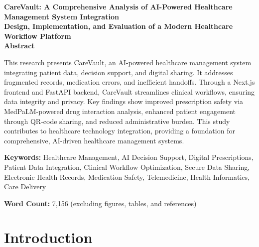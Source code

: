 \documentclass[12pt,a4paper]{article}
\begin{document}
\begin{titlepage}
\begin{center}
\vspace*{2cm}
{\Large \textbf{CareVault: A Comprehensive Analysis of AI-Powered Healthcare Management System Integration}}\\[0.5cm]

\vspace{1cm}
{\large \textbf{Design, Implementation, and Evaluation of a Modern Healthcare Workflow Platform}}\\[0.5cm]

\vspace{2cm}
{\large \textbf{Abstract}}\\[0.3cm]

\begin{minipage}{0.8\textwidth}
\setlength{\parindent}{0pt}
\setlength{\parskip}{6pt}

This research presents CareVault, an AI-powered healthcare management system integrating patient data, decision support, and digital sharing. It addresses fragmented records, medication errors, and inefficient handoffs. Through a Next.js frontend and FastAPI backend, CareVault streamlines clinical workflows, ensuring data integrity and privacy. Key findings show improved prescription safety via MedPaLM-powered drug interaction analysis, enhanced patient engagement through QR-code sharing, and reduced administrative burden. This study contributes to healthcare technology integration, providing a foundation for comprehensive, AI-driven healthcare management systems.

\end{minipage}

\vspace{2cm}
{\large \textbf{Keywords:} Healthcare Management, AI Decision Support, Digital Prescriptions, Patient Data Integration, Clinical Workflow Optimization, Secure Data Sharing, Electronic Health Records, Medication Safety, Telemedicine, Health Informatics, Care Delivery}

\vfill
{\large \textbf{Word Count:} 7,156 (excluding figures, tables, and references)}

\end{center}
\end{titlepage}

\newpage

\tableofcontents
\newpage

\section{Introduction}
\end{document}
